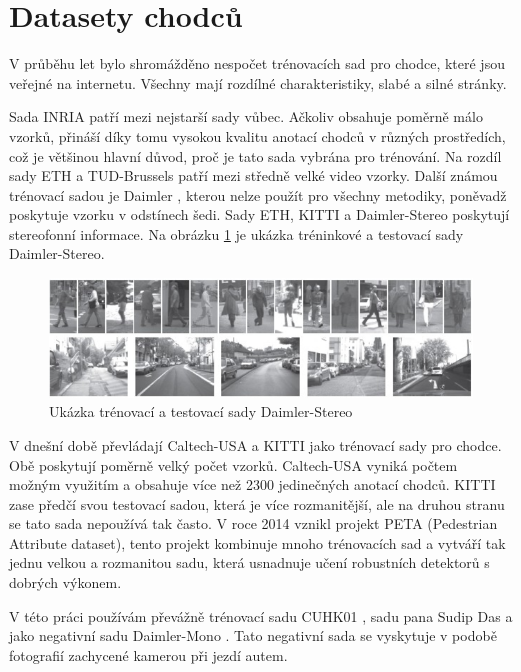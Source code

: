 \section{Datasety chodců} 
V průběhu let bylo shromážděno nespočet trénovacích sad pro chodce, které jsou veřejné na internetu. Všechny mají rozdílné charakteristiky, slabé a silné stránky. 

Sada INRIA \cite{inria} patří mezi nejstarší sady vůbec. Ačkoliv obsahuje poměrně málo vzorků, přináší díky tomu vysokou kvalitu anotací chodců v různých prostředích, což je většinou hlavní důvod, proč je tato sada vybrána pro trénování. Na rozdíl sady ETH \cite{eth} a TUD-Brussels \cite{tudbrussels} patří mezi středně velké video vzorky. Další známou trénovací sadou je Daimler \cite{daimler}, kterou nelze použít pro všechny metodiky, poněvadž poskytuje vzorku v odstínech šedi. Sady ETH, KITTI \cite{kitti} a Daimler-Stereo \cite{daimlerstereo} poskytují stereofonní informace. Na obrázku \ref{fig:daimler_stereo} je ukázka tréninkové a testovací sady Daimler-Stereo. 

\begin{figure}[H]
\centering
\includegraphics[width=16cm]{figures/daimler_stereo}
\caption{Ukázka trénovací a testovací sady Daimler-Stereo \cite{daimlerstereo}}
\label{fig:daimler_stereo}
\end{figure}

V dnešní době převládají Caltech-USA \cite{caltech} a KITTI jako trénovací sady pro chodce. Obě poskytují poměrně velký počet vzorků. Caltech-USA vyniká počtem možným využitím a obsahuje více než 2300 jedinečných anotací chodců. KITTI zase předčí svou testovací sadou, která je více rozmanitější, ale na druhou stranu se tato sada nepoužívá tak často. V roce 2014 vznikl projekt PETA (Pedestrian Attribute dataset)\cite{peta}, tento projekt kombinuje mnoho trénovacích sad a vytváří tak jednu velkou a rozmanitou sadu, která usnadnuje učení robustních detektorů s dobrých výkonem.

V této práci používám převážně trénovací sadu CUHK01 \cite{cuhk}, sadu pana Sudip Das \cite{sudipdas} a jako negativní sadu Daimler-Mono \cite{daimler}. Tato negativní sada se vyskytuje v podobě fotografií zachycené kamerou při jezdí autem. 

